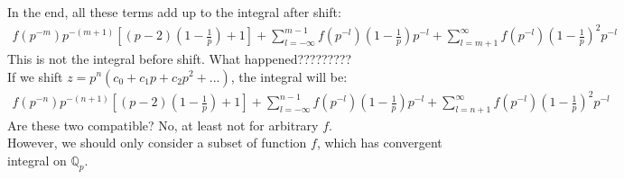 \documentclass[12pt]{article}
\begin{document}
In the end, all these terms add up to the integral after shift:
\begin{equation}
\begin{aligned}
f(p^{-m})p^{-(m+1)}[(p-2)(1-\frac{1}{p})+1]+\sum\limits_{l=-\infty}^{m-1}f(p^{-l})(1-\frac{1}{p})p^{-l}+\sum\limits_{l=m+1}^{\infty}f(p^{-l})(1-\frac{1}{p})^2 p^{-l}
\end{aligned}
\end{equation}
This is not the integral before shift. What happened?????????\\
If we shift $z=p^n(c_0+c_1 p+c_2 p^2+...)$, the integral will be:
\begin{equation}
\begin{aligned}
f(p^{-n})p^{-(n+1)}[(p-2)(1-\frac{1}{p})+1]+\sum\limits_{l=-\infty}^{n-1}f(p^{-l})(1-\frac{1}{p})p^{-l}+\sum\limits_{l=n+1}^{\infty}f(p^{-l})(1-\frac{1}{p})^2 p^{-l}
\end{aligned}
\end{equation}
Are these two compatible? No, at least not for arbitrary $f$. \\
However, we should only consider a subset of function $f$, which has convergent integral on $\mathbb{Q}_p$.
\end{document}
